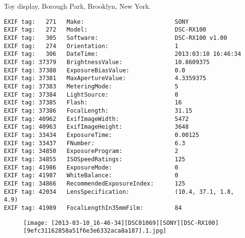 \section{\protect{}}
\noindent Toy display, Borough Park, Brooklyn, New York.
\noindent
\begin{lstlisting}
EXIF tag:   271   Make:                          SONY
EXIF tag:   272   Model:                         DSC-RX100
EXIF tag:   305   Software:                      DSC-RX100 v1.00
EXIF tag:   274   Orientation:                   1
EXIF tag:   306   DateTime:                      2013:03:10 16:46:34
EXIF tag: 37379   BrightnessValue:               10.8609375
EXIF tag: 37380   ExposureBiasValue:             0.0
EXIF tag: 37381   MaxApertureValue:              4.3359375
EXIF tag: 37383   MeteringMode:                  5
EXIF tag: 37384   LightSource:                   0
EXIF tag: 37385   Flash:                         16
EXIF tag: 37386   FocalLength:                   31.15
EXIF tag: 40962   ExifImageWidth:                5472
EXIF tag: 40963   ExifImageHeight:               3648
EXIF tag: 33434   ExposureTime:                  0.00125
EXIF tag: 33437   FNumber:                       6.3
EXIF tag: 34850   ExposureProgram:               2
EXIF tag: 34855   ISOSpeedRatings:               125
EXIF tag: 41986   ExposureMode:                  0
EXIF tag: 41987   WhiteBalance:                  0
EXIF tag: 34866   RecommendedExposureIndex:      125
EXIF tag: 42034   LensSpecification:             (10.4, 37.1, 1.8, 4.9)
EXIF tag: 41989   FocalLengthIn35mmFilm:         84

\end{lstlisting}
\clearpage
\begin{figure}
\raggedleft
\texttt{[image: [2013-03-10\_16-46-34][DSC01069][SONY][DSC-RX100][9efc31162858a51f6e3e6332aca8a187].1.jpg]}
\end{figure}


\clearpage
